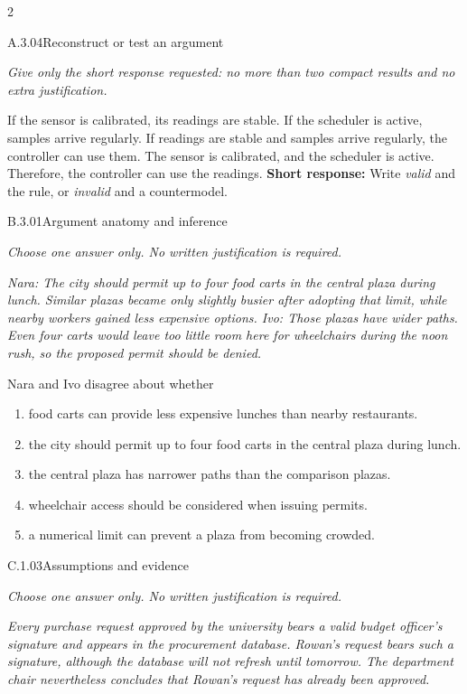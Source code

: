 \documentclass[9pt]{extarticle}
\newcommand{\choice}[1]{\item #1}
\begin{document}
\CoreWorkArea
\FormBreak
{}
\begin{multicols}{2}
\begin{DenseCoreProblem}{A.3.04}{Reconstruct or test an argument}
{\scriptsize\textit{Give only the short response requested: no more than two compact results and no extra justification.}\par}
If the sensor is calibrated, its readings are stable. If the scheduler is active, samples arrive regularly. If readings are stable and samples arrive regularly, the controller can use them. The sensor is calibrated, and the scheduler is active. Therefore, the controller can use the readings.
\textbf{Short response:} Write \emph{valid} and the rule, or \emph{invalid} and a countermodel.
\end{DenseCoreProblem}
\begin{DenseCoreProblem}{B.3.01}{Argument anatomy and inference}
{\scriptsize\textit{Choose one answer only. No written justification is required.}\par}
\emph{Nara: The city should permit up to four food carts in the central plaza during lunch. Similar plazas became only slightly busier after adopting that limit, while nearby workers gained less expensive options. Ivo: Those plazas have wider paths. Even four carts would leave too little room here for wheelchairs during the noon rush, so the proposed permit should be denied.}

Nara and Ivo disagree about whether
\begin{enumerate}[label=(\alph*)]
  \choice{food carts can provide less expensive lunches than nearby restaurants.}
  \choice{the city should permit up to four food carts in the central plaza during lunch.}
  \choice{the central plaza has narrower paths than the comparison plazas.}
  \choice{wheelchair access should be considered when issuing permits.}
  \choice{a numerical limit can prevent a plaza from becoming crowded.}
\end{enumerate}
\end{DenseCoreProblem}
\columnbreak
\begin{DenseCoreProblem}{C.1.03}{Assumptions and evidence}
{\scriptsize\textit{Choose one answer only. No written justification is required.}\par}
\emph{Every purchase request approved by the university bears a valid budget officer's signature and appears in the procurement database. Rowan's request bears such a signature, although the database will not refresh until tomorrow. The department chair nevertheless concludes that Rowan's request has already been approved.}


\end{DenseCoreProblem}
\end{multicols}
\end{document}
